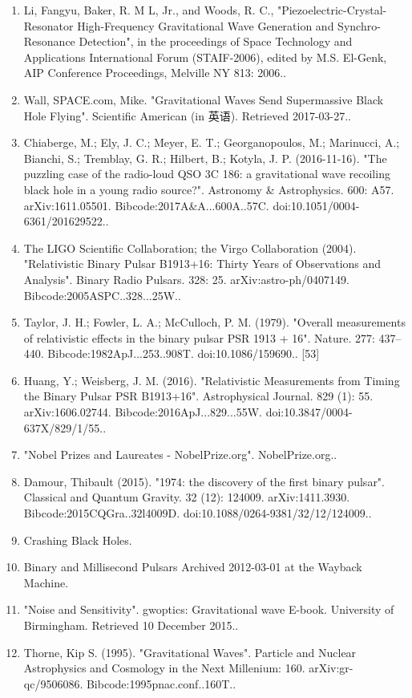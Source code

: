 \begin{enumerate}
\item Li, Fangyu, Baker, R. M L, Jr., and Woods, R. C., "Piezoelectric-Crystal-Resonator High-Frequency Gravitational Wave Generation and Synchro-Resonance Detection", in the proceedings of Space Technology and Applications International Forum (STAIF-2006), edited by M.S. El-Genk, AIP Conference Proceedings, Melville NY 813: 2006..
\item Wall, SPACE.com, Mike. "Gravitational Waves Send Supermassive Black Hole Flying". Scientific American (in 英语). Retrieved 2017-03-27..
\item Chiaberge, M.; Ely, J. C.; Meyer, E. T.; Georganopoulos, M.; Marinucci, A.; Bianchi, S.; Tremblay, G. R.; Hilbert, B.; Kotyla, J. P. (2016-11-16). "The puzzling case of the radio-loud QSO 3C 186: a gravitational wave recoiling black hole in a young radio source?". Astronomy & Astrophysics. 600: A57. arXiv:1611.05501. Bibcode:2017A&A...600A..57C. doi:10.1051/0004-6361/201629522..
\item The LIGO Scientific Collaboration; the Virgo Collaboration (2004). "Relativistic Binary Pulsar B1913+16: Thirty Years of Observations and Analysis". Binary Radio Pulsars. 328: 25. arXiv:astro-ph/0407149. Bibcode:2005ASPC..328...25W..
\item Taylor, J. H.; Fowler, L. A.; McCulloch, P. M. (1979). "Overall measurements of relativistic effects in the binary pulsar PSR 1913 + 16". Nature. 277: 437–440. Bibcode:1982ApJ...253..908T. doi:10.1086/159690..
[53]
\item Huang, Y.; Weisberg, J. M. (2016). "Relativistic Measurements from Timing the Binary Pulsar PSR B1913+16". Astrophysical Journal. 829 (1): 55. arXiv:1606.02744. Bibcode:2016ApJ...829...55W. doi:10.3847/0004-637X/829/1/55..
\item "Nobel Prizes and Laureates - NobelPrize.org". NobelPrize.org..
\item Damour, Thibault (2015). "1974: the discovery of the first binary pulsar". Classical and Quantum Gravity. 32 (12): 124009. arXiv:1411.3930. Bibcode:2015CQGra..32l4009D. doi:10.1088/0264-9381/32/12/124009..
\item Crashing Black Holes.
\item Binary and Millisecond Pulsars Archived 2012-03-01 at the Wayback Machine.
\item "Noise and Sensitivity". gwoptics: Gravitational wave E-book. University of Birmingham. Retrieved 10 December 2015..
\item Thorne, Kip S. (1995). "Gravitational Waves". Particle and Nuclear Astrophysics and Cosmology in the Next Millenium: 160. arXiv:gr-qc/9506086. Bibcode:1995pnac.conf..160T..

\end{enumerate}
